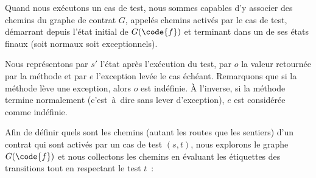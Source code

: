 Quand nous exécutons un cas de test, nous sommes capables d'y associer des
chemins du graphe de contrat $G$, appelés chemins {\strong activés par} le cas
de test, démarrant depuis l'état initial de $G(\code{f})$ et terminant dans un
de ses états finaux (soit normaux soit exceptionnels).

Nous représentons par $s'$ l'état après l'exécution du test, par $o$ la valeur
retournée par la méthode  et par $e$ l'exception levée le cas échéant.
Remarquons que si la méthode lève une exception, alors $o$ est indéfinie. À
l'inverse, si la méthode termine normalement (c'est~à~dire sans lever
d'exception), $e$ est considérée comme indéfinie.

Afin de définir quels sont les chemins (autant les routes que les sentiers) d'un
contrat qui sont activés par un cas de test $(s, t)$, nous explorons le graphe
$G(\code{f})$ et nous collectons les chemins en évaluant les étiquettes des
transitions tout en respectant le test $t$~:
%
